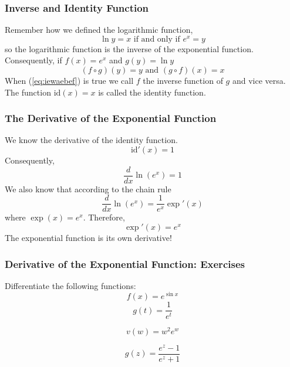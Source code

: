 \documentclass[xcolor=dvipsnames]{beamer}
\begin{document}
\begin{frame}
  \frametitle{Inverse and Identity Function}
Remember how we defined the logarithmic function,
\begin{equation}
  \label{eq:tieteiph}
  \ln{}y=x\mbox{ if and only if }e^{x}=y
\end{equation}
so the logarithmic function is the inverse of the exponential
function. Consequently, if $f(x)=e^{x}$ and $g(y)=\ln{}y$
\begin{equation}
  \label{eq:iewaebef}
  (f\circ{}g)(y)=y\mbox{ and }(g\circ{}f)(x)=x
\end{equation}
When (\ref{eq:iewaebef}) is true we call $f$ the \alert{inverse
  function} of $g$ and vice versa. The function $\mbox{id}(x)=x$ is called
the \alert{identity function}. 
\end{frame}

\begin{frame}
  \frametitle{The Derivative of the Exponential Function}
We know the derivative of the identity function.
\begin{equation}
  \label{eq:sivahzuw}
  \mbox{id}'(x)=1
\end{equation}
Consequently,
\begin{equation}
  \label{eq:zeejaixu}
  \frac{d}{dx}\ln\left(e^{x}\right)=1
\end{equation}
We also know that according to the chain rule
\begin{equation}
  \label{eq:iecheixo}
  \frac{d}{dx}\ln\left(e^{x}\right)=\frac{1}{e^{x}}\exp'(x)
\end{equation}
where $\exp(x)=e^{x}$. Therefore,
\begin{equation}
  \label{eq:zigaewai}
  \exp'(x)=e^{x}
\end{equation}
The exponential function is its own derivative!
\end{frame}

\begin{frame}
  \frametitle{Derivative of the Exponential Function: Exercises}
Differentiate the following functions:
\begin{equation}
  \label{eq:beetulae}
f(x)=e^{\sin{}x}  
\end{equation}
\begin{equation}
  \label{eq:aekephii}
g(t)=\frac{1}{e^{t}}  
\end{equation}

\bigskip

\begin{equation}
  \label{eq:uijeabai}
v(w)=w^{2}e^{w}  
\end{equation}

\bigskip

\begin{equation}
  \label{eq:ohzabeed}
g(z)=\frac{e^{z}-1}{e^{z}+1}  
\end{equation}
\end{frame}
\end{document}
